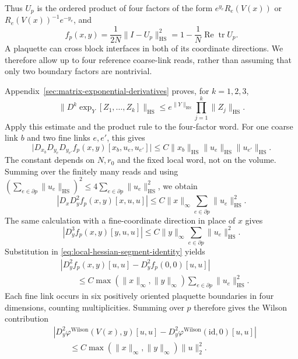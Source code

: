 \documentclass[10pt,reqno]{amsart}
\theoremstyle{definition}
\theoremstyle{remark}
\numberwithin{equation}{section}
\numberwithin{figure}{section}
\newcommand{\id}{\mathrm{id}}
\DeclareMathOperator{\tr}{tr}
\begin{document}
Thus $U_p$ is the ordered product of four factors of the form
$e^{y_e}R_e(V(x))$ or $R_e(V(x))^{-1}e^{-y_e}$, and
\begin{equation}\label{eq:plaquette-trace-function}
f_p(x,y)=\frac1{2N}\|I-U_p\|_{\mathrm{HS}}^2
=1-\frac1N\operatorname{Re}\tr U_p.
\end{equation}
A plaquette can cross block interfaces in both of its coordinate
directions. We therefore allow up to four reference coarse-link reads,
rather than assuming that only two boundary factors are nontrivial.

Appendix~\ref{sec:matrix-exponential-derivatives} proves, for $k=1,2,3$,
\begin{equation}\label{eq:local-exponential-derivative-input}
\|D^k\exp_Y[Z_1,\ldots,Z_k]\|_{\mathrm{HS}}
\le e^{\|Y\|_{\mathrm{HS}}}\prod_{j=1}^k\|Z_j\|_{\mathrm{HS}}.
\end{equation}
Apply this estimate and the product rule to the four-factor word.
For one coarse link $b$ and two fine links $e,e'$, this gives
\begin{equation}\label{eq:plaquette-third-partial-bound}
\bigl|D_{x_b}D_{y_e}D_{y_{e'}}f_p(x,y)[x_b,u_e,u_{e'}]\bigr|
\le C\|x_b\|_{\mathrm{HS}}\|u_e\|_{\mathrm{HS}}\|u_{e'}\|_{\mathrm{HS}}.
\end{equation}
The constant depends on $N,r_0$ and the fixed local word, not on the
volume. Summing over the finitely many reads and using
$(\sum_{e\in\partial p}\|u_e\|_{\mathrm{HS}})^2
\le4\sum_{e\in\partial p}\|u_e\|_{\mathrm{HS}}^2$, we obtain
\begin{equation}\label{eq:plaquette-mixed-third-bound}
|D_xD_y^2f_p(x,y)[x,u,u]|
\le C\|x\|_\infty\sum_{e\in\partial p}\|u_e\|_{\mathrm{HS}}^2.
\end{equation}
The same calculation with a fine-coordinate direction in place of $x$
gives
\begin{equation}\label{eq:plaquette-fine-third-bound}
|D_y^3f_p(x,y)[y,u,u]|
\le C\|y\|_\infty\sum_{e\in\partial p}\|u_e\|_{\mathrm{HS}}^2.
\end{equation}
Substitution in \eqref{eq:local-hessian-segment-identity} yields
\begin{equation}\label{eq:local-plaquette-hessian-stability}
\begin{aligned}
&|D_y^2f_p(x,y)[u,u]-D_y^2f_p(0,0)[u,u]|\\
&\qquad\le C\max(\|x\|_\infty,\|y\|_\infty)
\sum_{e\in\partial p}\|u_e\|_{\mathrm{HS}}^2.
\end{aligned}
\end{equation}
Each fine link occurs in six positively oriented plaquette boundaries
in four dimensions, counting multiplicities. Summing over $p$ therefore
gives the Wilson contribution
\begin{equation}\label{eq:wilson-hessian-stability}
\begin{aligned}
&|D_y^2\varphi^{\mathrm{Wilson}}(V(x),y)[u,u]
-D_y^2\varphi^{\mathrm{Wilson}}(\id,0)[u,u]|\\
&\qquad\le C\max(\|x\|_\infty,\|y\|_\infty)\|u\|_2^2.
\end{aligned}
\end{equation}
\end{document}
